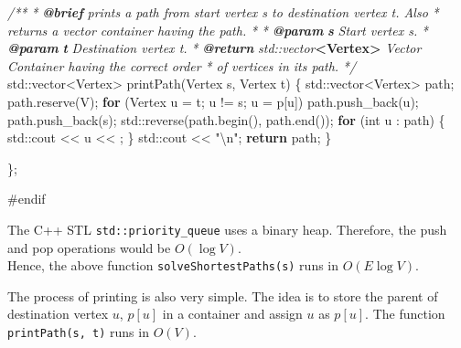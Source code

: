 \documentclass[
]{article}
\newenvironment{Shaded}{}{}
\newcommand{\AnnotationTok}[1]{\textcolor[rgb]{0.38,0.63,0.69}{\textbf{\textit{#1}}}}
\newcommand{\BuiltInTok}[1]{#1}
\newcommand{\CharTok}[1]{\textcolor[rgb]{0.25,0.44,0.63}{#1}}
\newcommand{\CommentTok}[1]{\textcolor[rgb]{0.38,0.63,0.69}{\textit{#1}}}
\newcommand{\CommentVarTok}[1]{\textcolor[rgb]{0.38,0.63,0.69}{\textbf{\textit{#1}}}}
\newcommand{\ControlFlowTok}[1]{\textcolor[rgb]{0.00,0.44,0.13}{\textbf{#1}}}
\newcommand{\DataTypeTok}[1]{\textcolor[rgb]{0.56,0.13,0.00}{#1}}
\newcommand{\KeywordTok}[1]{\textcolor[rgb]{0.00,0.44,0.13}{\textbf{#1}}}
\newcommand{\NormalTok}[1]{#1}
\newcommand{\PreprocessorTok}[1]{\textcolor[rgb]{0.74,0.48,0.00}{#1}}
\newcommand{\SpecialCharTok}[1]{\textcolor[rgb]{0.25,0.44,0.63}{#1}}
\newcommand{\StringTok}[1]{\textcolor[rgb]{0.25,0.44,0.63}{#1}}
\begin{document}
\begin{Shaded}
\begin{Highlighting}[]
    \CommentTok{/**}
\CommentTok{     * }\AnnotationTok{@brief}\CommentTok{ prints a path from start vertex s to destination vertex t. Also}
\CommentTok{     * returns a vector container having the path.}
\CommentTok{     * }
\CommentTok{     * }\AnnotationTok{@param}\CommentTok{ }\CommentVarTok{s}\CommentTok{ Start vertex s.}
\CommentTok{     * }\AnnotationTok{@param}\CommentTok{ }\CommentVarTok{t}\CommentTok{ Destination vertex t.}
\CommentTok{     * }\AnnotationTok{@return}\CommentTok{ std::vector}\KeywordTok{\textless{}Vertex\textgreater{}}\CommentTok{ Vector Container having the correct order }
\CommentTok{     * of vertices in its path.}
\CommentTok{     */}
    \BuiltInTok{std::}\NormalTok{vector\textless{}Vertex\textgreater{} printPath(Vertex s, Vertex t) \{}
        \BuiltInTok{std::}\NormalTok{vector\textless{}Vertex\textgreater{} path;}
\NormalTok{        path.reserve(V);}
        \ControlFlowTok{for}\NormalTok{ (Vertex u = t; u != s; u = p[u]) }
\NormalTok{            path.push\_back(u);}
\NormalTok{        path.push\_back(s);}
        \BuiltInTok{std::}\NormalTok{reverse(path.begin(), path.end());}
        \ControlFlowTok{for}\NormalTok{ (}\DataTypeTok{int}\NormalTok{ u : path) \{}
            \BuiltInTok{std::}\NormalTok{cout \textless{}\textless{} u \textless{}\textless{} }\CharTok{\textquotesingle{} \textquotesingle{}}\NormalTok{;}
\NormalTok{        \}}
        \BuiltInTok{std::}\NormalTok{cout \textless{}\textless{} }\StringTok{"}\SpecialCharTok{\textbackslash{}n}\StringTok{"}\NormalTok{;}
        \ControlFlowTok{return}\NormalTok{ path;}
\NormalTok{    \}}

\NormalTok{\};}

\PreprocessorTok{\#endif}
\end{Highlighting}
\end{Shaded}

The C++ STL \texttt{std::priority\_queue} uses a binary heap. Therefore,
the push and pop operations would be \(O(\log V)\).\\
Hence, the above function \texttt{solveShortestPaths(s)} runs in
\(O(E \log V)\).

The process of printing is also very simple. The idea is to store the
parent of destination vertex \(u\), \(p[u]\) in a container and assign
\(u\) as \(p[u]\). The function \texttt{printPath(s,\ t)} runs in
\(O(V)\).
\end{document}
